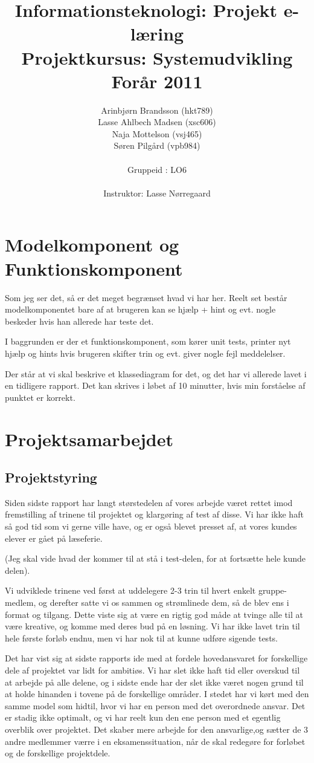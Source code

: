\documentclass[10pt,a4paper,danish]{article}
\title{Informationsteknologi: Projekt e-læring \\ Projektkursus: Systemudvikling \\Forår 2011}
\author{Arinbjørn Brandsson (hkt789)\\Lasse Ahlbech Madsen (xsc606)\\Naja Mottelson (vsj465)\\Søren Pilgård (vpb984)\\
\\
Gruppeid : LO6\\
\\Instruktor: Lasse Nørregaard}
\begin{document}
\maketitle
\newpage

\tableofcontents
\newpage



\section{Modelkomponent og Funktionskomponent}

Som jeg ser det, så er det meget begrænset hvad vi har her. Reelt set består
modelkomponentet bare af at brugeren kan se hjælp + hint og evt. nogle beskeder
hvis han allerede har teste det. 

I baggrunden er der et funktionskomponent, som kører unit tests, printer nyt
hjælp og hints hvis brugeren skifter trin og evt. giver nogle fejl meddelelser. 

Der står at vi skal beskrive et klassediagram for det, og det har vi allerede
lavet i en tidligere rapport. Det kan skrives i løbet af 10 minutter, hvis min
forståelse af punktet er korrekt. 

\section{Projektsamarbejdet}
\subsection{Projektstyring}
Siden sidste rapport har langt størstedelen af vores arbejde været rettet imod
fremstilling af trinene til projektet og klargøring af test af disse. Vi har
ikke haft så god tid som vi gerne ville have, og er også blevet presset af, at
vores kundes elever er gået på læseferie. 

(Jeg skal vide hvad der kommer til at stå i test-delen, for at fortsætte hele kunde delen).

Vi udviklede trinene ved først at uddelegere 2-3 trin til hvert enkelt gruppe-
medlem, og derefter satte vi os sammen og strømlinede dem, så de blev ens i
format og tilgang. Dette viste sig at være en rigtig god måde at tvinge alle
til at være kreative, og komme med deres bud på en løsning. Vi har ikke lavet
trin til hele første forløb endnu, men vi har nok til at kunne udføre sigende
tests.

Det har vist sig at sidste rapports ide med at fordele hovedansvaret for
forskellige dele af projektet var lidt for ambitiøs. Vi har slet ikke haft tid
eller overskud til at arbejde på alle delene, og i sidste ende har der slet
ikke været nogen grund til at holde hinanden i tovene på de forskellige områder.
I stedet har vi kørt med den samme model som hidtil, hvor vi har en person med
det overordnede ansvar. Det er stadig ikke optimalt, og vi har reelt kun den ene
person med et egentlig overblik over projektet. Det skaber mere arbejde for den
ansvarlige,og sætter de 3 andre medlemmer værre i en eksamenssituation, når de
skal redegøre for forløbet og de forskellige projektdele.
\end{document}
